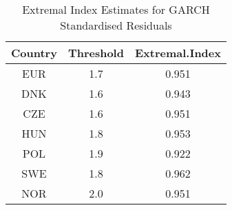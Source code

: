 \begin{table}[!h]
\centering
\caption{Extremal Index Estimates for GARCH Standardised Residuals}
\centering
\begin{tabular}[t]{ccc}
\toprule
Country & Threshold & Extremal.Index\\
\midrule
EUR & 1.7 & 0.951\\
DNK & 1.6 & 0.943\\
CZE & 1.6 & 0.951\\
HUN & 1.8 & 0.953\\
POL & 1.9 & 0.922\\
\addlinespace
SWE & 1.8 & 0.962\\
NOR & 2.0 & 0.951\\
\bottomrule
\end{tabular}
\end{table}
